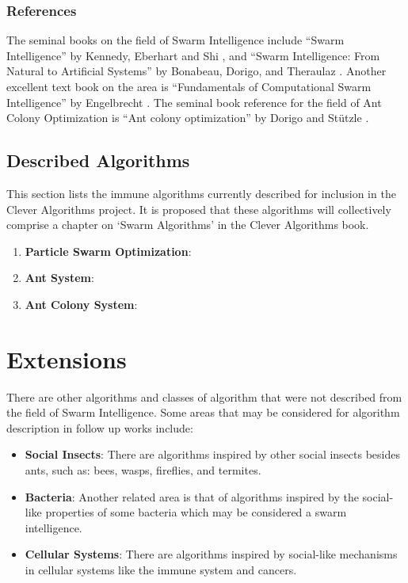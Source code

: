 \documentclass[a4paper, 11pt]{article}
\begin{document}
\subsubsection{References}
The seminal books on the field of Swarm Intelligence include ``Swarm Intelligence'' by Kennedy, Eberhart and Shi \cite{Kennedy2001}, and ``Swarm Intelligence: From Natural to Artificial Systems'' by Bonabeau, Dorigo, and Theraulaz \cite{Bonabeau1999}. Another excellent text book on the area is ``Fundamentals of Computational Swarm Intelligence'' by Engelbrecht \cite{Engelbrecht2006}. The seminal book reference for the field of Ant Colony Optimization is ``Ant colony optimization'' by Dorigo and St\"utzle \cite{Dorigo2004}.

% 
% 
\subsection{Described Algorithms}
\label{subsec:algorithms}
This section lists the immune algorithms currently described for inclusion in the Clever Algorithms project. It is proposed that these algorithms will collectively comprise a chapter on `Swarm Algorithms' in the Clever Algorithms book. 

\begin{enumerate}
	\item \textbf{Particle Swarm Optimization}: \cite{Brownlee2010ac}
	\item \textbf{Ant System}: \cite{Brownlee2010ad}
	\item \textbf{Ant Colony System}: \cite{Brownlee2010ae}
\end{enumerate}

% 
% 
\section{Extensions}
\label{sec:extensions}
There are other algorithms and classes of algorithm that were not described from the field of Swarm Intelligence. Some areas that may be considered for algorithm description in follow up works include:

\begin{itemize}
	\item \textbf{Social Insects}: There are algorithms inspired by other social insects besides ants, such as: bees, wasps, fireflies, and termites. 
	\item \textbf{Bacteria}: Another related area is that of algorithms inspired by the social-like properties of some bacteria which may be considered a swarm intelligence.
	\item \textbf{Cellular Systems}: There are algorithms inspired by social-like mechanisms in cellular systems like the immune system and cancers.  
\end{itemize}
\end{document}
